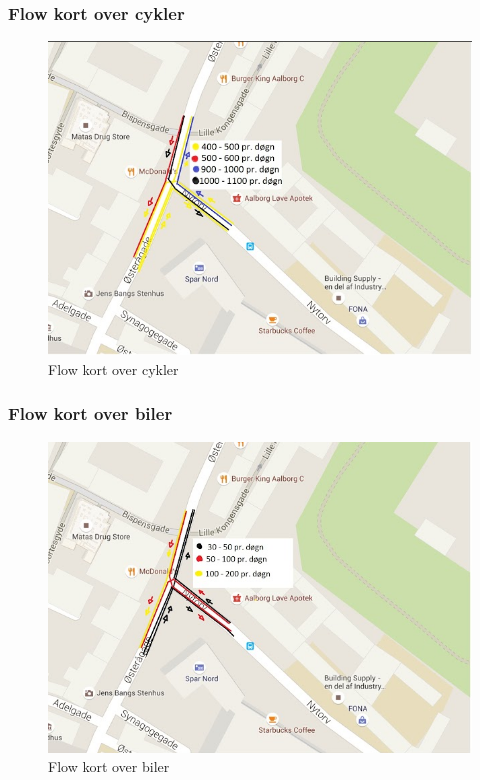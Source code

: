 \subsubsection{Flow kort over cykler}
\begin{figure}[htbp]
   \label{fig:Flowkort_cykler}
   \centering
   \begin{adjustbox}{max width=\textwidth}
     \includegraphics{billederogfigur/flowkortcykel.jpg}
  \end{adjustbox}
   \caption{Flow kort over cykler}
 \end{figure}
 \subsubsection{Flow kort over biler}
 \begin{figure}[htbp]
   \label{fig:Flowkort_biler}
   \centering
   \begin{adjustbox}{max width=\textwidth}
     \includegraphics{billederogfigur/flowkortbil.jpg}
  \end{adjustbox}
   \caption{Flow kort over biler}
 \end{figure}
